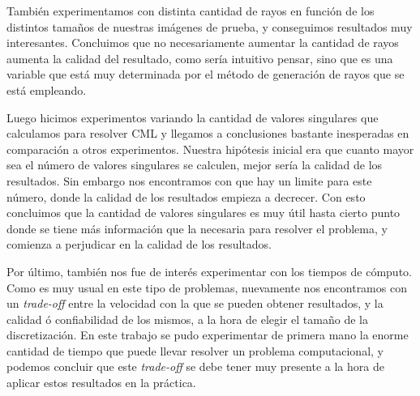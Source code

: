 También experimentamos con distinta cantidad de rayos en función de los distintos tamaños de nuestras imágenes de prueba, y conseguimos
resultados muy interesantes. Concluimos que no necesariamente aumentar la cantidad de rayos aumenta la calidad del resultado, como sería 
intuitivo pensar, sino que es una variable que está muy determinada por el método de generación de rayos que se está empleando.

Luego hicimos experimentos variando la cantidad de valores singulares que calculamos para resolver CML y llegamos a conclusiones bastante 
inesperadas en comparación a otros experimentos. Nuestra hipótesis inicial era que cuanto mayor sea el número de valores singulares se 
calculen, mejor sería la calidad de los resultados. Sin embargo nos encontramos con que hay un limite para este número, donde la calidad de los 
resultados empieza a decrecer. Con esto concluimos que la cantidad de valores singulares es muy útil hasta cierto punto donde se tiene más 
información que la necesaria para resolver el problema, y comienza a perjudicar en la calidad de los resultados.

Por último, también nos fue de interés experimentar con los tiempos de cómputo. Como es muy usual en este tipo de problemas, nuevamente 
nos encontramos con un \textit{trade-off} entre la velocidad con la que se pueden obtener resultados, y la calidad ó confiabilidad 
de los mismos, a la hora de elegir el tamaño de la discretización. En este trabajo se pudo experimentar de primera mano la enorme cantidad de tiempo que puede llevar resolver un problema 
computacional, y podemos concluir que este \textit{trade-off} se debe tener muy presente a la hora de aplicar estos resultados en la 
práctica.
